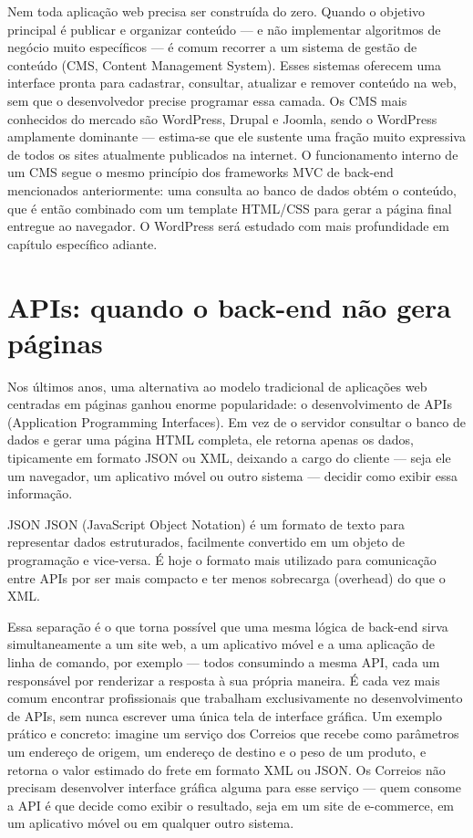 Nem toda aplicação web precisa ser construída do zero. Quando o objetivo principal é publicar e organizar conteúdo — e não implementar algoritmos de negócio muito específicos — é comum recorrer a um sistema de gestão de conteúdo (CMS, Content Management System). Esses sistemas oferecem uma interface pronta para cadastrar, consultar, atualizar e remover conteúdo na web, sem que o desenvolvedor precise programar essa camada. Os CMS mais conhecidos do mercado são WordPress, Drupal e Joomla, sendo o WordPress amplamente dominante — estima-se que ele sustente uma fração muito expressiva de todos os sites atualmente publicados na internet. O funcionamento interno de um CMS segue o mesmo princípio dos frameworks MVC de back-end mencionados anteriormente: uma consulta ao banco de dados obtém o conteúdo, que é então combinado com um template HTML/CSS para gerar a página final entregue ao navegador. O WordPress será estudado com mais profundidade em capítulo específico adiante.

\section{APIs: quando o back-end não gera páginas}

Nos últimos anos, uma alternativa ao modelo tradicional de aplicações web centradas em páginas ganhou enorme popularidade: o desenvolvimento de APIs (Application Programming Interfaces). Em vez de o servidor consultar o banco de dados e gerar uma página HTML completa, ele retorna apenas os dados, tipicamente em formato JSON ou XML, deixando a cargo do cliente — seja ele um navegador, um aplicativo móvel ou outro sistema — decidir como exibir essa informação.

\begin{codebox}{JSON}
 JSON (JavaScript Object Notation) é um formato de texto para representar dados
 estruturados, facilmente convertido em um objeto de programação e vice-versa. É
 hoje o formato mais utilizado para comunicação entre APIs por ser mais compacto
 e ter menos sobrecarga (overhead) do que o XML.
\end{codebox}

Essa separação é o que torna possível que uma mesma lógica de back-end sirva simultaneamente a um site web, a um aplicativo móvel e a uma aplicação de linha de comando, por exemplo — todos consumindo a mesma API, cada um responsável por renderizar a resposta à sua própria maneira. É cada vez mais comum encontrar profissionais que trabalham exclusivamente no desenvolvimento de APIs, sem nunca escrever uma única tela de interface gráfica. Um exemplo prático e concreto: imagine um serviço dos Correios que recebe como parâmetros um endereço de origem, um endereço de destino e o peso de um produto, e retorna o valor estimado do frete em formato XML ou JSON. Os Correios não precisam desenvolver interface gráfica alguma para esse serviço — quem consome a API é que decide como exibir o resultado, seja em um site de e-commerce, em um aplicativo móvel ou em qualquer outro sistema.

